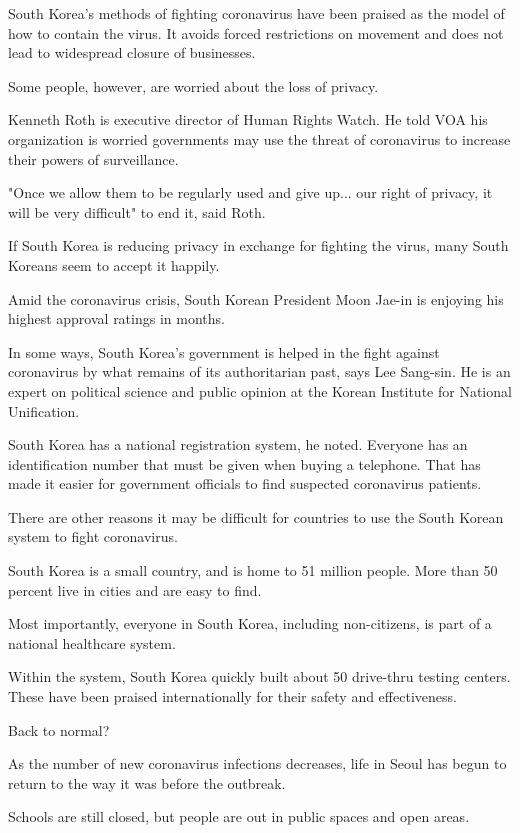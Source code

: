 South Korea's methods of fighting coronavirus have been praised as the model of how to contain the virus. It avoids forced restrictions on movement and does not lead to widespread closure of businesses.

Some people, however, are worried about the loss of privacy.

Kenneth Roth is executive director of Human Rights Watch. He told VOA his organization is worried governments may use the threat of coronavirus to increase their powers of surveillance.

"Once we allow them to be regularly used and give up... our right of privacy, it will be very difficult" to end it, said Roth.

If South Korea is reducing privacy in exchange for fighting the virus, many South Koreans seem to accept it happily.

Amid the coronavirus crisis, South Korean President Moon Jae-in is enjoying his highest approval ratings in months.

In some ways, South Korea's government is helped in the fight against coronavirus by what remains of its authoritarian past, says Lee Sang-sin. He is an expert on political science and public opinion at the Korean Institute for National Unification.

South Korea has a national registration system, he noted. Everyone has an identification number that must be given when buying a telephone. That has made it easier for government officials to find suspected coronavirus patients.

There are other reasons it may be difficult for countries to use the South Korean system to fight coronavirus.

South Korea is a small country, and is home to 51 million people. More than 50 percent live in cities and are easy to find.

Most importantly, everyone in South Korea, including non-citizens, is part of a national healthcare system.

Within the system, South Korea quickly built about 50 drive-thru testing centers. These have been praised internationally for their safety and effectiveness.

Back to normal?

As the number of new coronavirus infections decreases, life in Seoul has begun to return to the way it was before the outbreak.

Schools are still closed, but people are out in public spaces and open areas.

